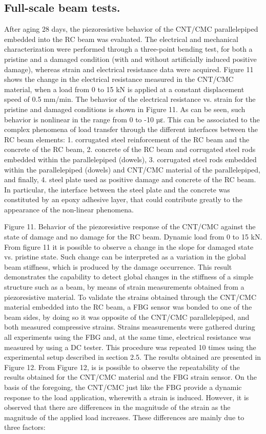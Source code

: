 \documentclass[twocolumn]{bmcart}%
\begin{document}
\subsection{ Full-scale beam tests.}

After aging 28 days, the piezoresistive behavior of the CNT/CMC parallelepiped embedded into the RC beam was evaluated. The electrical and mechanical characterization were performed through a three-point bending test, for both a pristine and a damaged condition (with and without artificially induced positive damage), whereas strain and electrical resistance data were acquired. Figure 11 shows the change in the electrical resistance measured in the CNT/CMC material, when a load from 0 to 15 kN is applied at a constant displacement speed of 0.5 mm/min.
The behavior of the electrical resistance vs. strain for the pristine and damaged conditions is shown in Figure 11. As can be seen, such behavior is nonlinear in the range from 0 to -10 µε. This can be associated to the complex phenomena of load transfer through the different interfaces between the RC beam elements: 1. corrugated steel reinforcement of the RC beam and the concrete of the RC beam, 2. concrete of the RC beam and corrugated steel rods embedded within the parallelepiped (dowels), 3. corrugated steel rods embedded within the parallelepiped (dowels)  and CNT/CMC material of the parallelepiped, and finally, 4. steel plate used as positive damage and concrete of the RC beam. In particular, the interface between the steel plate and the concrete was constituted by an epoxy adhesive layer, that could contribute greatly to the appearance of the non-linear phenomena.

Figure 11. Behavior of the piezoresistive response of the CNT/CMC against the state of damage and no damage for the RC beam. Dynamic load from 0 to 15 kN.
From figure 11 it is possible to observe a change in the slope for damaged state vs. pristine state. Such change can be interpreted as a variation in the global beam stiffness, which is produced by the damage occurrence. This result demonstrates the capability to detect global changes in the stiffness of a simple structure such as a beam, by means of strain measurements obtained from a piezoresistive material.
To validate the strains obtained through the CNT/CMC material embedded into the RC beam, a FBG sensor was bonded to one of the beam sides, by doing so it was opposite of the CNT/CMC parallelepiped, and both measured compressive strains. Strains measurements were gathered during all experiments using the FBG and, at the same time, electrical resistance was measured by using a DC tester. This procedure was repeated 10 times using the experimental setup described in section 2.5. The results obtained are presented in Figure 12.
From Figure 12, is is possible to observe the repeatability of the results obtained for the CNT/CMC material and the FBG strain sensor. On the basis of the foregoing, the CNT/CMC just like the FBG provide a dynamic response to the load application, wherewith a strain is induced. However, it is observed that there are differences in the magnitude of the strain as the magnitude of the applied load increases. These differences are mainly due to three factors: 
\end{document}
